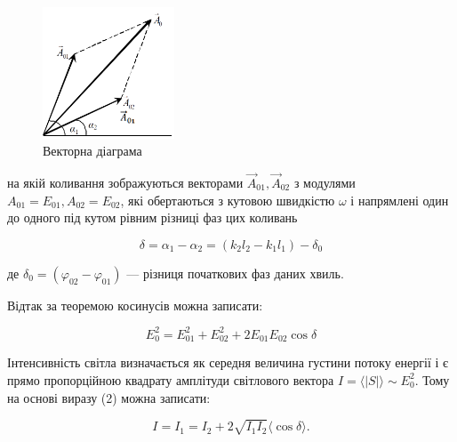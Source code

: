 \documentclass[12pt,a4paper]{article}
\begin{document}
    \begin{figure}[!ht]

        \renewcommand{\thefigure}{\arabic{figure}} %

        \centering
        \includegraphics[width=0.35\textwidth]{1.png}
        \caption{Векторна діаграма}
        \label{fig1:schema}

    \end{figure}

    на якій коливання зображуються векторами $\vec{A}_{01}, \vec{A}_{02}$ з модулями  $A_{01} = E_{01}, A_{02} = E_{02}$, 
    які обертаються з кутовою швидкістю $\omega$ і напрямлені один до одного під
    кутом рівним різниці фаз цих коливань

    \begin{equation}
        \delta = \alpha_1 - \alpha_2 = (k_2 l_2 - k_1 l_1) - \delta_0
        \tag{1}
    \end{equation}

    де $\delta_0 = (\varphi_{02} - \varphi_{01})$ --- різниця початкових фаз даних хвиль.

    Відтак за теоремою косинусів можна записати:

    \begin{equation}
        E_0^2 = E_{01}^2 + E_{02}^2 + 2E_{01} E_{02} \cos \delta
        \tag{2}
    \end{equation}

    Інтенсивність світла визначається як середня величина густини потоку енергії і є прямо пропорційною квадрату амплітуди
    світлового вектора $I = \langle |S| \rangle \sim E_0^2$. Тому на основі виразу (2) можна записати:

    \begin{equation}
        I = I_1 = I_2 + 2\sqrt{I_1 I_2} \langle \cos \delta \rangle.
        \tag{3}
    \end{equation}
\end{document}
